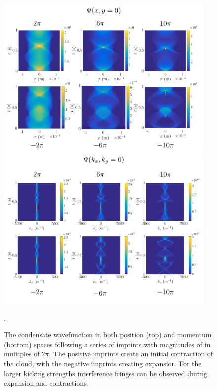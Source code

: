 \begin{figure}\centering
    \includegraphics[width=0.95\textwidth]{Images/ch4_vtx/velocity/gaussian_imprint_wfcr}
    \includegraphics[width=0.95\textwidth]{Images/ch4_vtx/velocity/gaussian_imprint_wfck}    \caption{The condensate wavefunction in both position (top) and momentum (bottom) spaces following a series of imprints with magnitudes of in multiples of $2\pi$. The positive imprints create an initial contraction of the cloud, with the negative imprints creating expansion. For the larger kicking strengths interference fringes can be observed during expansion and contractions.}.\label{fig:gaussian_wfc}
\end{figure}

